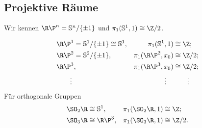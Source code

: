 \subsection{Projektive Räume}

Wir kennen $\R\P^n = \S^n / \{\pm 1\}$ und $\pi_1(\S^1, 1) \isomorphic \Z / 2$.

\begin{align*}
	\R\P^1 &= \S^1 / \{\pm 1\} \homeomorphic \S^1, & \pi_1(\S^1, 1) & \isomorphic \Z; \\
	\R\P^2 &= \S^2 / \{\pm 1\}, & \pi_1(\R\P^2, x_0) &\isomorphic \Z / 2; \\
	\R\P^3&, & \pi_1(\R\P^3, x_0) &\isomorphic \Z / 2; \\
	\vdots\;& & \vdots\quad & \qquad \vdots
\end{align*}
Für orthogonale Gruppen
\begin{align*}
	\SO_2 \R &\homeomorphic \S^1, & \pi_1(\SO_2 \R, 1) &\isomorphic \Z; \\
	\SO_3 \R &\homeomorphic \R\P^3, & \pi_1(\SO_3 \R, 1) &\isomorphic \Z / 2.
\end{align*}








